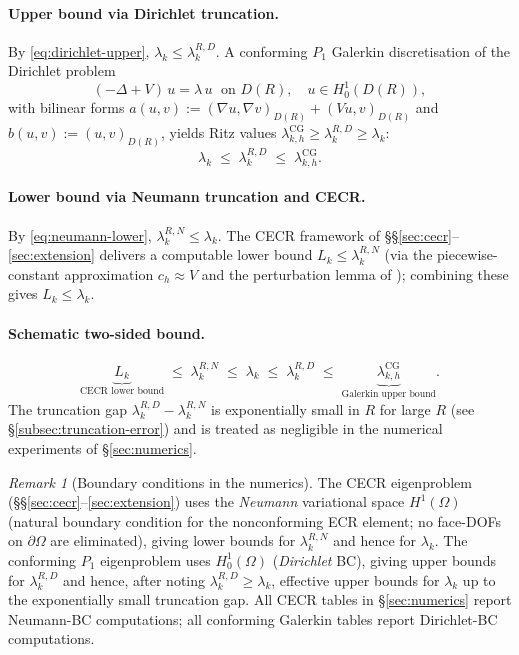 \documentclass[11pt]{article}
\theoremstyle{plain}
\theoremstyle{definition}
\theoremstyle{remark}
\newtheorem{remark}{Remark}
\newcommand{\CG}{\mathrm{CG}}
\begin{document}
\paragraph{Upper bound via Dirichlet truncation.}
By \eqref{eq:dirichlet-upper}, $\lambda_k\le\lambda_k^{R,D}$.
A conforming $P_1$ Galerkin discretisation of the Dirichlet problem
\begin{equation}
\label{eq:evp-dirichlet}
  (-\Delta + V)\,u = \lambda\, u \;\text{ on } D(R),
  \quad u\in H^1_0(D(R)),
\end{equation}
with bilinear forms
$a(u,v):=(\nabla u,\nabla v)_{D(R)}+(Vu,v)_{D(R)}$
and $b(u,v):=(u,v)_{D(R)}$,
yields Ritz values $\lambda_{k,h}^{\CG}\ge\lambda_k^{R,D}\ge\lambda_k$:
\begin{equation}
\label{eq:two-sided-ub}
  \lambda_k \;\le\; \lambda_k^{R,D} \;\le\; \lambda_{k,h}^{\CG}.
\end{equation}

\paragraph{Lower bound via Neumann truncation and CECR.}
By \eqref{eq:neumann-lower}, $\lambda_k^{R,N}\le\lambda_k$.
The CECR framework of \S\S\ref{sec:cecr}--\ref{sec:extension}
delivers a computable lower bound $L_k\le\lambda_k^{R,N}$
(via the piecewise-constant approximation $c_h\approx V$ and
the perturbation lemma of );
combining these gives $L_k\le\lambda_k$.

\paragraph{Schematic two-sided bound.}
\begin{equation}
\label{eq:two-sided-schematic}
  \underbrace{L_k}_{\text{CECR lower bound}}
  \;\le\; \lambda_k^{R,N}
  \;\le\; \lambda_k
  \;\le\; \lambda_k^{R,D}
  \;\le\;
  \underbrace{\lambda_{k,h}^{\CG}}_{\text{Galerkin upper bound}}.
\end{equation}
The truncation gap $\lambda_k^{R,D}-\lambda_k^{R,N}$ is
exponentially small in $R$ for large $R$
(see \S\ref{subsec:truncation-error}) and is treated as
negligible in the numerical experiments of \S\ref{sec:numerics}.

\begin{remark}[Boundary conditions in the numerics]
\label{rmk:bc-convention}
The CECR eigenproblem (§\S\ref{sec:cecr}--\ref{sec:extension})
uses the \emph{Neumann} variational space $H^1(\Omega)$
(natural boundary condition for the nonconforming ECR element;
no face-DOFs on $\partial\Omega$ are eliminated), giving lower
bounds for $\lambda_k^{R,N}$ and hence for $\lambda_k$.
The conforming $P_1$ eigenproblem uses
$H^1_0(\Omega)$ (\emph{Dirichlet} BC), giving upper bounds for
$\lambda_k^{R,D}$ and hence, after noting $\lambda_k^{R,D}\ge\lambda_k$,
effective upper bounds for $\lambda_k$ up to the exponentially small
truncation gap.
All CECR tables in \S\ref{sec:numerics} report Neumann-BC computations;
all conforming Galerkin tables report Dirichlet-BC computations.
\end{remark}
\end{document}
